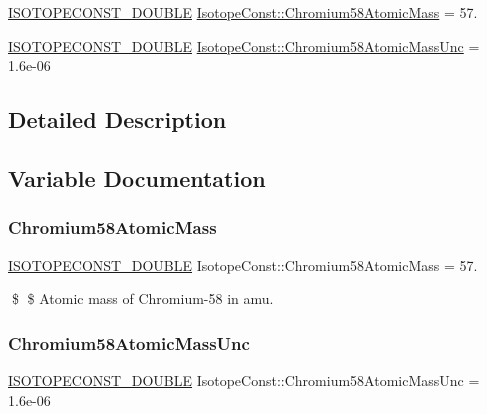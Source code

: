 \begin{DoxyCompactItemize}
\item 
\mbox{\hyperlink{group___isotope_const-_macros_ga8f45a7272ce02c0b4c65c44636ed719a}{I\+S\+O\+T\+O\+P\+E\+C\+O\+N\+S\+T\+\_\+\+D\+O\+U\+B\+LE}} \mbox{\hyperlink{group___isotope_const-_chromium-_cr58_gad3bf8744570fd89efbc3d4a9356b146a}{Isotope\+Const\+::\+Chromium58\+Atomic\+Mass}} = 57.
\item 
\mbox{\hyperlink{group___isotope_const-_macros_ga8f45a7272ce02c0b4c65c44636ed719a}{I\+S\+O\+T\+O\+P\+E\+C\+O\+N\+S\+T\+\_\+\+D\+O\+U\+B\+LE}} \mbox{\hyperlink{group___isotope_const-_chromium-_cr58_ga362f5bbd3cf607b752e8e8e305b206a6}{Isotope\+Const\+::\+Chromium58\+Atomic\+Mass\+Unc}} = 1.\+6e-\/06
\end{DoxyCompactItemize}


\subsection{Detailed Description}


\subsection{Variable Documentation}
\mbox{\label{group___isotope_const-_chromium-_cr58_gad3bf8744570fd89efbc3d4a9356b146a}} 
\subsubsection{\texorpdfstring{Chromium58\+Atomic\+Mass}{Chromium58AtomicMass}}
{\footnotesize\ttfamily \mbox{\hyperlink{group___isotope_const-_macros_ga8f45a7272ce02c0b4c65c44636ed719a}{I\+S\+O\+T\+O\+P\+E\+C\+O\+N\+S\+T\+\_\+\+D\+O\+U\+B\+LE}} Isotope\+Const\+::\+Chromium58\+Atomic\+Mass = 57.}

\$ \$ Atomic mass of Chromium-\/58 in amu. \mbox{\label{group___isotope_const-_chromium-_cr58_ga362f5bbd3cf607b752e8e8e305b206a6}} 
\subsubsection{\texorpdfstring{Chromium58\+Atomic\+Mass\+Unc}{Chromium58AtomicMassUnc}}
{\footnotesize\ttfamily \mbox{\hyperlink{group___isotope_const-_macros_ga8f45a7272ce02c0b4c65c44636ed719a}{I\+S\+O\+T\+O\+P\+E\+C\+O\+N\+S\+T\+\_\+\+D\+O\+U\+B\+LE}} Isotope\+Const\+::\+Chromium58\+Atomic\+Mass\+Unc = 1.\+6e-\/06}

